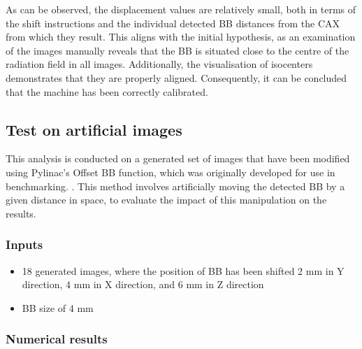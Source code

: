 As can be observed, the displacement values are relatively small, both in terms of the shift instructions and the individual detected BB distances from the CAX from which they result. This aligns with the initial hypothesis, as an examination of the images manually reveals that the BB is situated close to the centre of the radiation field in all images. Additionally, the visualisation of isocenters demonstrates that they are properly aligned. Consequently, it can be concluded that the machine has been correctly calibrated.

\subsection{Test on artificial images}

This analysis is conducted on a generated set of images that have been modified using Pylinac's Offset BB function, which was originally developed for use in benchmarking. \cite{pylinac_benchmarking}. This method involves artificially moving the detected BB by a given distance in space, to evaluate the impact of this manipulation on the results.

\subsubsection{Inputs}

\begin{itemize}
    \item 18 generated images, where the position of BB has been shifted 2 mm in Y direction, 4 mm in X direction, and 6 mm in Z direction
    \item BB size of 4 mm
\end{itemize}

\subsubsection{Numerical results}

